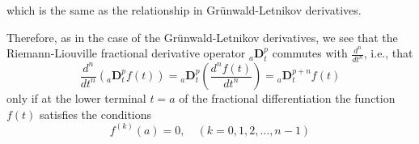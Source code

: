 \documentclass[a4paper,14pt,oneside]{book}
\theoremstyle{plain}
\theoremstyle{definition}
\theoremstyle{remark}
\begin{document}
\begin{center}
\begin{flushleft}
{which is the same as the relationship in Grünwald-Letnikov derivatives. 
\par Therefore, as in the case of the Grünwald-Letnikov derivatives, we see that the Riemann-Liouville fractional derivative operator ${ }_{a} \mathbf{D}_{t}^{p}$ commutes with $\frac{d^{n}}{d t^{n}}$, i.e., that
\begin{equation}\label{eq:3.45}
\frac{d^{n}}{d t^{n}}\left({ }_{a} \mathbf{D}_{t}^{p} f(t)\right)={ }_{a} \mathbf{D}_{t}^{p}\left(\frac{d^{n} f(t)}{d t^{n}}\right)={ }_{a} \mathbf{D}_{t}^{p+n} f(t)
\end{equation}
only if at the lower terminal $t=a$ of the fractional differentiation the function $f(t)$ satisfies the conditions
\begin{equation}\label{eq:3.46}
f^{(k)}(a)=0, \quad(k=0,1,2, \ldots, n-1)
\end{equation}

}
\end{flushleft}
\end{center}
\end{document}
